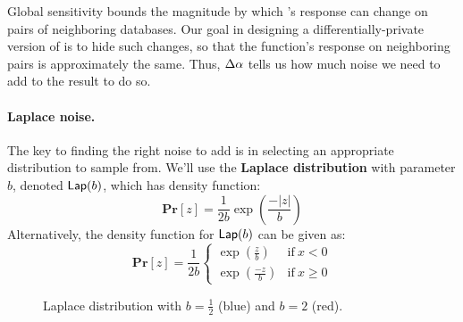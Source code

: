 \documentclass[11pt,twoside]{scrartcl}
\begin{document}
Global sensitivity bounds the magnitude by which \san's response can change on pairs of neighboring databases. Our goal in designing a differentially-private version of \san is to hide such changes, so that the function's response on neighboring pairs is approximately the same. Thus, $\Delta\alpha$ tells us how much noise we need to add to the result to do so.

\paragraph{Laplace noise.}
The key to finding the right noise to add is in selecting an appropriate distribution to sample from. We'll use the \textbf{Laplace distribution} with parameter $b$, denoted $\mathsf{Lap}(b)$, which has density function:
\begin{equation}
\label{eq:lap}
\mathbf{Pr}[z] = \frac{1}{2b}\exp\left(\frac{-|z|}{b}\right)
\end{equation}
Alternatively, the density function for $\mathsf{Lap}(b)$ can be given as:
\begin{equation}
\label{eq:lap2}
\mathbf{Pr}[z] = 
\frac{1}{2b}
\left\{
\begin{array}{ll}
%
\exp\left(\frac{z}{b}\right) & \mathrm{if\ } x < 0 \\
\exp\left(\frac{-z}{b}\right) & \mathrm{if\ } x \ge 0 
\end{array}
\right.
\end{equation}

\begin{figure}
\centering
{}
\label{fig:laplace}
\caption{Laplace distribution with $b=\frac{1}{2}$ (blue) and $b = 2$ (red).}
\end{figure}
\end{document}

